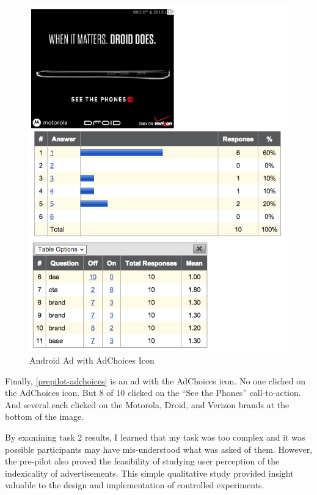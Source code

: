 \begin{figure}
\centerline{
\includegraphics[scale=.3]{chapter6.tex/daa-example}
}
\caption{Android Ad with AdChoices Icon}
\label{prepilot-adchoices}
\end{figure}


Finally,  \autoref{prepilot-adchoices}  is an ad with the AdChoices icon. No one clicked on the AdChoices icon. But 8 of 10 clicked on the ``See the Phones'' call-to-action. And several each clicked on the Motorola, Droid, and Verizon brands at the bottom of the image.

By examining task 2 results, I learned that my task was too complex and it was possible participants may have mis-understood what was asked of them. However, the pre-pilot also proved the feasibility of studying user perception of the indexicality of advertisements. This simple qualitative study provided insight valuable to the design and implementation of controlled experiments.

